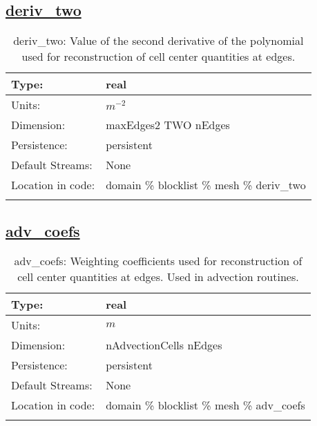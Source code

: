 \subsection[deriv\_two]{\hyperref[sec:var_tab_mesh]{deriv\_two}}
\label{subsec:var_sec_mesh_deriv_two}
\begin{center}
\begin{longtable}{| p{2.0in} | p{4.0in} |}
        \hline 
        Type: & real \\
        \hline 
        Units: & $m^{-2}$ \\
        \hline 
        Dimension: & maxEdges2 TWO nEdges \\
        \hline 
        Persistence: & persistent \\
        \hline 
		 Default Streams: & None \\
        \hline 
		 Location in code: & domain \% blocklist \% mesh \% deriv\_two \\
		 \hline 
    \caption{deriv\_two: Value of the second derivative of the polynomial used for reconstruction of cell center quantities at edges.}
\end{longtable}
\end{center}
\subsection[adv\_coefs]{\hyperref[sec:var_tab_mesh]{adv\_coefs}}
\label{subsec:var_sec_mesh_adv_coefs}
\begin{center}
\begin{longtable}{| p{2.0in} | p{4.0in} |}
        \hline 
        Type: & real \\
        \hline 
        Units: & $m$ \\
        \hline 
        Dimension: & nAdvectionCells nEdges \\
        \hline 
        Persistence: & persistent \\
        \hline 
		 Default Streams: & None \\
        \hline 
		 Location in code: & domain \% blocklist \% mesh \% adv\_coefs \\
		 \hline 
    \caption{adv\_coefs: Weighting coefficients used for reconstruction of cell center quantities at edges. Used in advection routines.}
\end{longtable}
\end{center}
